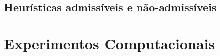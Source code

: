 \subsection{Heurísticas admissíveis e não-admissíveis}
\label{sec-aestrela-algoritmo-heuristica}  

\section{Experimentos Computacionais}
\label{sec-aestrela-experimentos}
